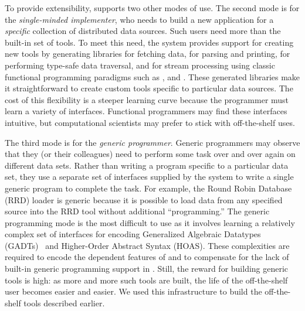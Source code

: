 To provide extensibility, \padsd{} supports two other
modes of use. 
The second mode is
for the {\em single-minded implementer}, who needs to build a new
application for a {\em specific} collection of distributed data
sources.  Such users need more than the built-in set of tools. To meet
this need, the system provides support for
creating new tools by generating libraries for fetching
data, for parsing and printing, for performing type-safe data
traversal, and for stream processing using classic functional
programming paradigms such as ,  and .
These generated libraries make it straightforward to create custom tools
specific to particular data sources.  The cost of this flexibility is
a steeper learning curve because the programmer must learn a variety
of interfaces. Functional programmers may find
these interfaces intuitive, but computational scientists
may prefer to stick with off-the-shelf uses. 

The third mode is for the {\em generic programmer}.  Generic
programmers may observe that they (or their colleagues) 
need to perform some task over and over again on different
data sets.  Rather than writing a program specific to a particular
data set, they use a 
separate set of interfaces supplied by the \padsd{} system to write a
single generic program to complete the task.  For example, the Round Robin
Database (RRD) loader is generic because it is possible to load data from any
specified source into the RRD tool \cite{rrdtool} 
without additional ``programming.''
The generic programming mode is the most difficult to use as it involves
learning a relatively complex set of interfaces for encoding
Generalized Algebraic Datatypes (GADTs)~\cite{xi:popl03} 
and Higher-Order Abstract Syntax (HOAS). 
These complexities are required to encode 
the dependent features of \padsd{} and to compensate for the lack of
built-in generic programming support in \ocaml{}. 
Still, the reward for building generic tools is high:
as more and more such tools are built, the life of the off-the-shelf
user becomes easier and easier.  We used this infrastructure to
build the off-the-shelf tools described earlier.



